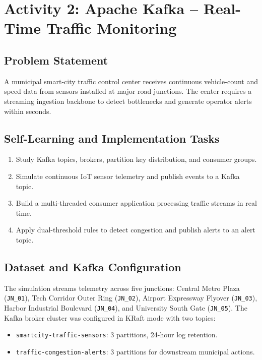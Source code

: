 \documentclass[12pt,a4paper]{report}
\newcommand{\activityheading}[2]{%
  \section{Activity #1: #2}%
}
\begin{document}
\clearpage
\activityheading{2}{Apache Kafka -- Real-Time Traffic Monitoring}

\subsection{Problem Statement}
A municipal smart-city traffic control center receives continuous vehicle-count and speed data from sensors installed at major road junctions. The center requires a streaming ingestion backbone to detect bottlenecks and generate operator alerts within seconds.

\subsection{Self-Learning and Implementation Tasks}
\begin{enumerate}
    \item Study Kafka topics, brokers, partition key distribution, and consumer groups.
    \item Simulate continuous IoT sensor telemetry and publish events to a Kafka topic.
    \item Build a multi-threaded consumer application processing traffic streams in real time.
    \item Apply dual-threshold rules to detect congestion and publish alerts to an alert topic.
\end{enumerate}

\subsection{Dataset and Kafka Configuration}
The simulation streams telemetry across five junctions: Central Metro Plaza (\texttt{JN\_01}), Tech Corridor Outer Ring (\texttt{JN\_02}), Airport Expressway Flyover (\texttt{JN\_03}), Harbor Industrial Boulevard (\texttt{JN\_04}), and University South Gate (\texttt{JN\_05}). The Kafka broker cluster was configured in KRaft mode with two topics:
\begin{itemize}
    \item \texttt{smartcity-traffic-sensors}: 3 partitions, 24-hour log retention.
    \item \texttt{traffic-congestion-alerts}: 3 partitions for downstream municipal actions.
\end{itemize}
\end{document}
